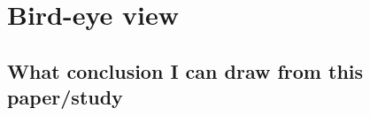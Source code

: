 \documentclass[a4paper,11pt,UKenglish,twoside,openright]{report}\usepackage[]{graphicx}\usepackage[]{color}
\begin{document}
\section{Bird-eye view}

\subsection{What conclusion I can draw from this paper/study}

\newpage
\printbibliography[title=References]





\begin{appendices}
    
         \begin{singlespace}
    
         \end{singlespace}
%     
        \begin{singlespace}
    
        \end{singlespace}
%    
%    
%    
%    
\end{appendices}

\cleardoublepage
{}
{}
\printindex[a]

\cleardoublepage
{}
{}
\printindex
\end{document}
